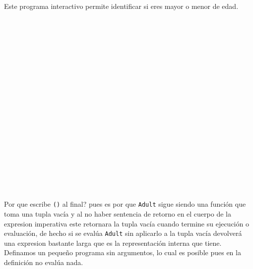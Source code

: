       Este programa interactivo permite identificar si eres mayor o menor de edad.
      
      \begin{fxcode}
         \\
         \\
         \\
         \\
         \\
         \\
         \\
         \\
         \\
         \\
         \\
         \\
         \\
         \\
         \\
         \\
         \\
         \\
         \outcode{()                             }
      \end{fxcode}
            
      Por que escribe \texttt{()} al final? pues es por que \texttt{Adult} sigue siendo una función que toma una tupla vacía y al no haber sentencia de retorno en el cuerpo de la expresion imperativa este retornara la tupla vacía cuando termine su ejecución o evaluación, de hecho si se evalúa \texttt{Adult} sin aplicarlo a la tupla vacía devolverá una expresion bastante larga que es la representación interna que tiene.
      \\
            
      Definamos un pequeño programa sin argumentos, lo cual es posible pues en la definición no evalúa nada.
      
